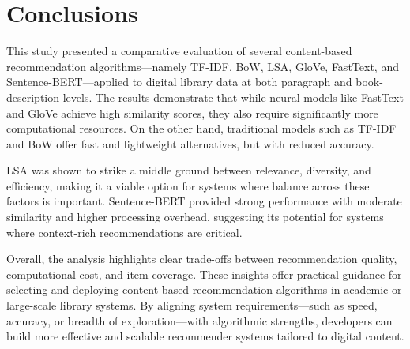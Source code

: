 \documentclass{llncs}
\begin{document}
%




\section{Conclusions}

This study presented a comparative evaluation of several content-based recommendation algorithms—namely TF-IDF, BoW, LSA, GloVe, FastText, and Sentence-BERT—applied to digital library data at both paragraph and book-description levels. The results demonstrate that while neural models like FastText and GloVe achieve high similarity scores, they also require significantly more computational resources. On the other hand, traditional models such as TF-IDF and BoW offer fast and lightweight alternatives, but with reduced accuracy.

LSA was shown to strike a middle ground between relevance, diversity, and efficiency, making it a viable option for systems where balance across these factors is important. Sentence-BERT provided strong performance with moderate similarity and higher processing overhead, suggesting its potential for systems where context-rich recommendations are critical.

Overall, the analysis highlights clear trade-offs between recommendation quality, computational cost, and item coverage. These insights offer practical guidance for selecting and deploying content-based recommendation algorithms in academic or large-scale library systems. By aligning system requirements—such as speed, accuracy, or breadth of exploration—with algorithmic strengths, developers can build more effective and scalable recommender systems tailored to digital content.\\
\end{document}
